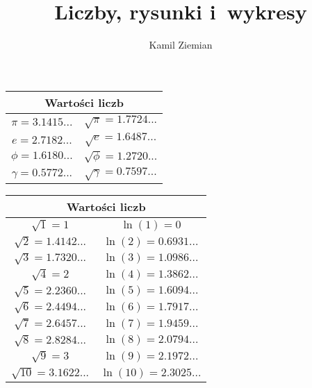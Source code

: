 \documentclass[a4paper,11pt]{article}
\title{Liczby, rysunki i~wykresy}
\author{Kamil Ziemian}
\begin{document}





\maketitle %



\begin{center}

  \begin{tabular}{|c|c|}
    \hline
    \multicolumn{2}{|c|}{Wartości liczb} \\
    \hline
    $\pi = 3.1415...$ & $\sqrt{ \pi } = 1.7724...$ \\
    $e = 2.7182...$ & $\sqrt{ e } = 1.6487...$ \\
    $\phi = 1.6180...$ & $\sqrt{ \phi } = 1.2720...$ \\
    $\gamma = 0.5772...$ & $\sqrt{ \gamma } = 0.7597...$ \\
    \hline
  \end{tabular}

\end{center}





\begin{center}

  \begin{tabular}{|c|c|}
    \hline
    \multicolumn{2}{|c|}{Wartości liczb} \\
    \hline
    $\sqrt{ 1 } = 1$ & $\ln( 1 ) = 0$ \\
    $\sqrt{ 2 } = 1.4142...$ & $\ln( 2 ) = 0.6931...$ \\
    $\sqrt{ 3 } = 1.7320...$ & $\ln( 3 ) = 1.0986...$ \\
    $\sqrt{ 4 } = 2$ & $\ln( 4 ) = 1.3862...$ \\
    $\sqrt{ 5 } = 2.2360...$ & $\ln( 5 ) = 1.6094...$ \\
    $\sqrt{ 6 } = 2.4494...$ & $\ln( 6 ) = 1.7917...$ \\
    $\sqrt{ 7 } = 2.6457...$ & $\ln( 7 ) = 1.9459...$ \\
    $\sqrt{ 8 } = 2.8284...$ & $\ln( 8 ) = 2.0794...$ \\
    $\sqrt{ 9 } = 3$ & $\ln( 9 ) = 2.1972...$ \\
    $\sqrt{ 10 } = 3.1622...$ & $\ln( 10 ) = 2.3025...$ \\
    \hline
  \end{tabular}

\end{center}
\end{document}
